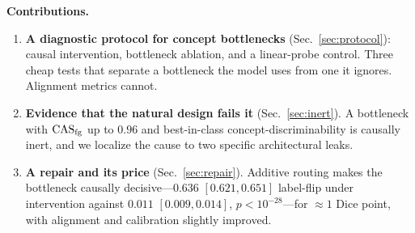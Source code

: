 \noindent\textbf{Contributions.}
\begin{enumerate}\itemsep2pt
\item \textbf{A diagnostic protocol for concept bottlenecks} (Sec.~\ref{sec:protocol}): causal
intervention, bottleneck ablation, and a linear-probe control. Three cheap tests that separate a
bottleneck the model uses from one it ignores. Alignment metrics cannot.
\item \textbf{Evidence that the natural design fails it} (Sec.~\ref{sec:inert}). A bottleneck with
$\mathrm{CAS}_{\mathrm{fg}}$ up to $0.96$ and best-in-class concept-discriminability is causally inert, and we localize
the cause to two specific architectural leaks.
\item \textbf{A repair and its price} (Sec.~\ref{sec:repair}). Additive routing makes the
bottleneck causally decisive---$0.636$ $[0.621,0.651]$ label-flip under intervention against
$0.011$ $[0.009,0.014]$, $p<10^{-28}$---for ${\approx}1$ Dice point, with alignment and calibration
slightly improved.
\end{enumerate}
